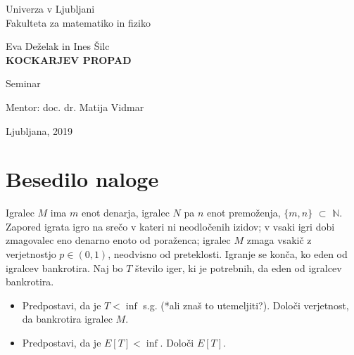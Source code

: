 \documentclass[12pt, a4paper]{article}
\begin{document}
\begin{titlepage}
\begin{center}

\large
Univerza v Ljubljani\\
\normalsize
Fakulteta za matematiko in fiziko\\

\vspace{3 cm} 

\large
Eva Deželak in Ines Šilc\\

\vspace{0.5cm}
\LARGE
\textbf{KOCKARJEV PROPAD}

\vspace{0.5 cm}
\normalsize
Seminar

\vspace{1.5cm}
\normalsize
Mentor: doc. dr. Matija Vidmar

\vspace{3cm}


\vfill

\large Ljubljana, 2019

\end{center}
\end{titlepage}

\newpage

\tableofcontents

\newpage

 \section[Besedilo naloge]{Besedilo naloge}


\begin{flushleft}
Igralec $M$ ima $m$ enot denarja, igralec $N$ pa $n$ enot premoženja, $\{m, n\}$ $\subset$ $\mathbb{N}$. Zapored igrata igro na srečo v kateri ni neodločenih izidov; v vsaki igri dobi zmagovalec eno denarno enoto od poraženca; igralec $M$ zmaga vsakič z verjetnostjo $p \in (0, 1)$, neodvisno od preteklosti. Igranje se konča, ko eden od igralcev bankrotira. Naj bo $T$ število iger, ki je potrebnih, da eden od igralcev bankrotira.

\begin{itemize}
    \item Predpostavi, da je $T < \inf$ s.g. (*ali znaš to utemeljiti?). Določi verjetnost, da bankrotira igralec $M$.
    \item Predpostavi, da je $E[T] < \inf$. Določi $E[T]$.
\end{itemize}
\end{flushleft}
\end{document}
